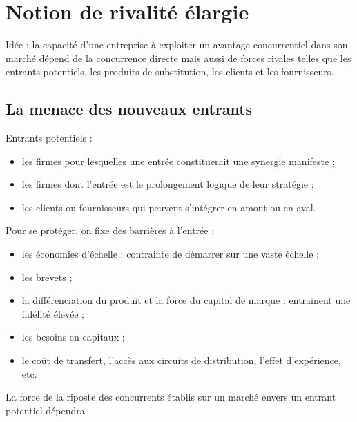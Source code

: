 		
	\section{Notion de rivalité élargie}
		

		
	
	Idée : la capacité d'une entreprise à exploiter un avantage concurrentiel dans son marché dépend de la concurrence directe mais aussi de forces rivales telles que les entrants potentiels, les produits de substitution, les clients et les fournisseurs.
	
	
		\subsection{La menace des nouveaux entrants}
		
		Entrants potentiels :
		
		\begin{itemize}
			\item les firmes pour lesquelles une entrée constituerait une synergie manifeste ;
			\item les firmes dont l'entrée est le prolongement logique de leur stratégie ;
			\item les clients ou fournisseurs qui peuvent s'intégrer en amont ou en aval.
		\end{itemize}
		\n
		Pour se protéger, on fixe des barrières à l'entrée :
		
		\begin{itemize}
			\item les économies d'échelle : contrainte de démarrer sur une vaste échelle ;
			\item les brevets ;
			\item la différenciation du produit et la force du capital de marque : entrainent une fidélité élevée ;
			\item les besoins en capitaux ;
			\item le coût de transfert, l'accès aux circuits de distribution, l'effet d'expérience, etc.
		\end{itemize}
		\n
		La force de la riposte des concurrents établis sur un marché envers un entrant potentiel dépendra 
		
